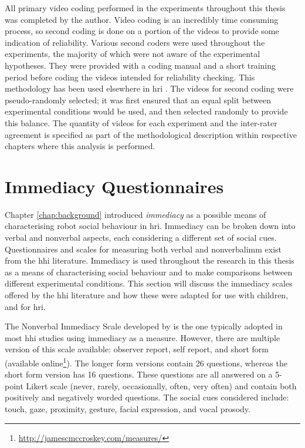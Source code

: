 All primary video coding performed in the experiments throughout this thesis was completed by the author. Video coding is an incredibly time consuming process, so second coding is done on a portion of the videos to provide some indication of reliability. Various second coders were used throughout the experiments, the majority of which were not aware of the experimental hypotheses. They were provided with a coding manual and a short training period before coding the videos intended for reliability checking. This methodology has been used elsewhere in \acrshort{hri} \citep{moshkina2014social}. The videos for second coding were pseudo-randomly selected; it was first ensured that an equal split between experimental conditions would be used, and then selected randomly to provide this balance. The quantity of videos for each experiment and the inter-rater agreement is specified as part of the methodological description within respective chapters where this analysis is performed.

\section{Immediacy Questionnaires}\label{sec:method-nvi}
Chapter \ref{chap:background} introduced \textit{\gls{immediacy}} as a possible means of characterising robot social behaviour in \acrshort{hri}. Immediacy can be broken down into verbal and nonverbal aspects, each considering a different set of social cues. Questionnaires and scales for measuring both verbal and \gls{nonverbalimm} exist from the \acrshort{hhi} literature. Immediacy is used throughout the research in this thesis as a means of characterising social behaviour and to make comparisons between different experimental conditions. This section will discuss the \gls{immediacy} scales offered by the \acrshort{hhi} literature and how these were adapted for use with children, and for \acrshort{hri}.

The Nonverbal Immediacy Scale developed by \cite{richmond2003development} is the one typically adopted in most \acrshort{hhi} studies using \gls{immediacy} as a measure. However, there are multiple version of this scale available: observer report, self report, and short form (available online\footnote{\url{http://jamescmccroskey.com/measures/}}). The longer form versions contain 26 questions, whereas the short form version has 16 questions. These questions are all answered on a 5-point Likert scale (never, rarely, occasionally, often, very often) and contain both positively and negatively worded questions. The social cues considered include: touch, gaze, proximity, gesture, facial expression, and vocal prosody.

